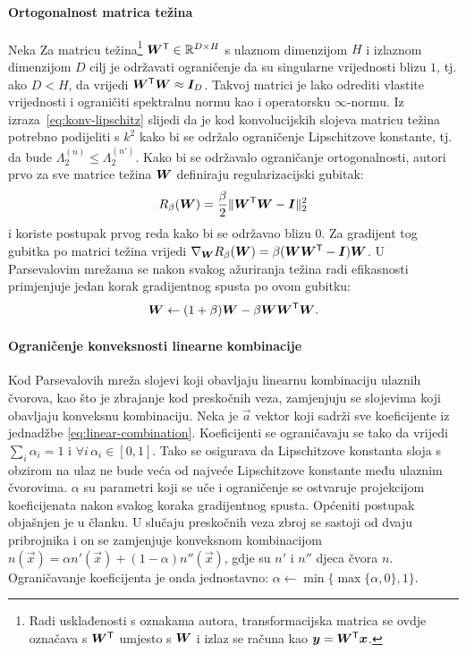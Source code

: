 \documentclass[utf8, seminar, numeric, lmodern]{feri}
\begin{document}
\paragraph{Ortogonalnost matrica težina} Neka Za matricu težina\footnote{Radi usklađenosti s oznakama autora, transformacijska matrica se ovdje označava s $\bm{W}^\mathsf T$ umjesto s $\bm{W}$ i izlaz se računa kao $\bm{y}=\bm{W}^\mathsf T \bm{x}$.} $\bm{W}^\mathsf T \in\mathbb{R}^{D\times H}$ s ulaznom dimenzijom $H$ i izlaznom dimenzijom $D$ cilj je održavati ograničenje da su singularne vrijednosti blizu $1$, tj. ako $D<H$, da vrijedi $\bm{W}^\mathsf T \bm{W} \approx \bm{I}_D$. Takvoj matrici je lako odrediti vlastite vrijednosti i ograničiti spektralnu normu kao i operatorsku $\infty$-normu. Iz izraza~\ref{eq:konv-lipschitz} slijedi da je kod konvolucijskih slojeva matricu težina potrebno podijeliti s $k^2$ kako bi se održalo ograničenje Lipschitzove konstante, tj. da bude $\Lambda_2^{(n)}\leq\Lambda_2^{(n')}$. Kako bi se održavalo ograničanje ortogonalnosti, autori prvo za sve matrice težina $\bm{W}$ definiraju regularizacijski gubitak:
\begin{equation}
R_\beta(\bm{W}) = \frac{\beta}{2}\lVert \bm{W}^\mathsf T \bm{W}-\bm{I}\rVert_2^2
\end{equation}
i koriste postupak prvog reda kako bi se održavao blizu 0. Za gradijent tog gubitka po matrici težina vrijedi $\nabla_{\bm{W}} R_\beta(\bm{W})=\beta(\bm{W}\bm{W}^\mathsf T-\bm{I})\bm{W}$. U Parsevalovim mrežama se nakon svakog ažuriranja težina radi efikasnosti primjenjuje jedan korak gradijentnog spusta po ovom gubitku:
\begin{equation}
\bm{W} \gets (1+\beta)\bm{W}-\beta \bm{W}\bm{W}^\mathsf T \bm{W}. 
\end{equation}

\paragraph{Ograničenje konveksnosti linearne kombinacije} Kod Parsevalovih mreža slojevi koji obavljaju linearnu kombinaciju ulaznih čvorova, kao što je zbrajanje kod preskočnih veza, zamjenjuju se slojevima koji obavljaju konveksnu kombinaciju. Neka je $\vec a$ vektor koji sadrži sve koeficijente iz jednadžbe \eqref{eq:linear-combination}. Koeficijenti se ograničavaju se tako da vrijedi $\sum_i \alpha_i=1$ i $\forall i\, \alpha_i \in \left[0,1\right]$. Tako se osigurava da Lipschitzove konstanta sloja s obzirom na ulaz ne bude veća od najveće Lipschitzove konstante među ulaznim čvorovima. $\alpha$ su parametri koji se uče i ograničenje se ostvaruje projekcijom koeficijenata nakon svakog koraka gradijentnog spusta. Općeniti postupak objašnjen je u članku. U slučaju preskočnih veza zbroj se sastoji od dvaju pribrojnika i on se zamjenjuje konveksnom kombinacijom
$n(\vec x) = \alpha n'(\vec x) + (1-\alpha)n''(\vec x)$, gdje su $n'$ i $n''$ djeca čvora $n$. Ograničavanje koeficijenta je onda jednostavno: $\alpha\gets\min\{\max\{\alpha, 0\},1\}$.
\end{document}
